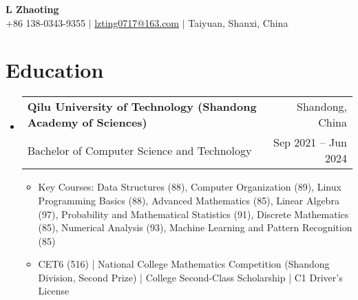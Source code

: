 \documentclass[a4paper,11pt]{article}
\makeatletter
\newenvironment{resumeList}{\begin{itemize}[leftmargin=*,label={}]}{\end{itemize}}
\newcommand{\resumeItem}[1]{\item\small{#1}}
\newcommand{\resumeEntry}[4]{
  \item \begin{tabular*}{0.97\textwidth}[t]{l@{\extracolsep{\fill}}r}
    \textbf{#1} & #2 \\
    #3 & #4 \\
  \end{tabular*}
}
\makeatother
\begin{document}
\begin{center}
    {\Huge\bfseries L Zhaoting} \\ \vspace{3pt}
    \small
    \faMobile \hspace{.5pt} +86 138-0343-9355 $|$ \faAt \hspace{.5pt} \href{mailto:lvzting0717@163.com}{lzting0717@163.com} $|$ \faMapMarker \hspace{.5pt} Taiyuan, Shanxi, China 
\end{center}

\section{Education}
\begin{resumeList}
    \resumeEntry{Qilu University of Technology (Shandong Academy of Sciences)}{Shandong, China}{Bachelor of Computer Science and Technology}{Sep 2021 -- Jun 2024}
    \begin{resumeList}
        \resumeItem{Key Courses: Data Structures (88), Computer Organization (89), Linux Programming Basics (88), Advanced Mathematics (85), Linear Algebra (97), Probability and Mathematical Statistics (91), Discrete Mathematics (85), Numerical Analysis (93), Machine Learning and Pattern Recognition (85)}
        \resumeItem{CET6 (516) | National College Mathematics Competition (Shandong Division, Second Prize) | College Second-Class Scholarship | C1 Driver's License}
    \end{resumeList}
\end{resumeList}

\end{document}
